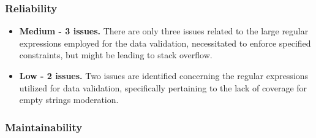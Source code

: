 \documentclass{sigchi}
\begin{document}
\subsubsection{\textbf{Reliability}}

\begin{itemize}
    \item \textbf{Medium - 3 issues.} There are only three issues related to the large regular expressions employed for the data validation, necessitated to enforce specified constraints, but might be leading to stack overflow.
    \item \textbf{Low - 2 issues.} Two issues are identified concerning the regular expressions utilized for data validation, specifically pertaining to the lack of coverage for empty strings moderation.  
\end{itemize}

\subsubsection{\textbf{Maintainability}}
\end{document}
